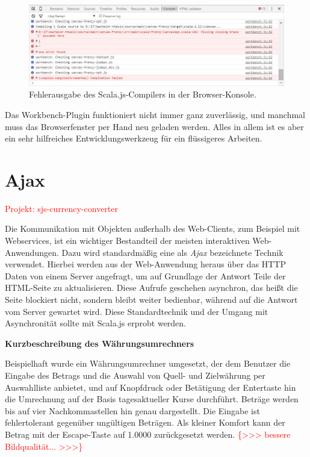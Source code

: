 \documentclass[a4paper, 12pt, hidelinks, listof=totoc, listoftables=totoc, bibliography=totoc]{scrreprt}
\newcommand{\TODO}[1]{\textcolor{red}{#1}\newline}
\newcommand{\TODOi}[1]{\textcolor{red}{\{#1\}}}
\newcommand{\MyMiniSec}[1]{\rmfamily\fontsize{12}{15}\selectfont
	\vspace{7pt}\textbf{#1} %
}
\begin{document}
\begin{figure}[!h]
    \centering
    \includegraphics[width=1.0\textwidth]{workbench-in-action2}
    \caption{Fehlerausgabe des Scala.js-Compilers in der Browser-Konsole.}
    \label{fig:workbench-in-action2}
\end{figure}

Das Workbench-Plugin funktioniert nicht immer ganz zuverlässig, und manchmal muss das Browserfenster per Hand neu geladen werden. Alles in allem ist es aber ein sehr hilfreiches Entwicklungswerkzeug für ein flüssigeres Arbeiten.



\section{Ajax}

\TODO{Projekt: sjs-currency-converter}

Die Kommunikation mit Objekten außerhalb des Web-Clients, zum Beispiel mit Webservices, ist ein wichtiger Bestandteil der meisten interaktiven Web-Anwendungen. Dazu wird standardmäßig eine als \emph{Ajax} bezeichnete Technik verwendet. Hierbei werden aus der Web-Anwendung heraus über das \ac{HTTP} Daten von einem Server angefragt, um auf Grundlage der Antwort Teile der \ac{HTML}-Seite zu aktualisieren. \cite[S.~491]{flanagan2011.JDG} Diese Aufrufe geschehen asynchron, das heißt die Seite blockiert nicht, sondern bleibt weiter bedienbar, während auf die Antwort vom Server gewartet wird. Diese Standardtechnik und der Umgang mit Asynchronität sollte mit Scala.js erprobt werden.


\MyMiniSec{Kurzbeschreibung des Währungsumrechners}

Beispielhaft wurde ein Währungsumrechner umgesetzt, der dem Benutzer die Eingabe des Betrags und die Auswahl von Quell- und Zielwährung per Auswahlliste anbietet, und auf Knopfdruck oder Betätigung der Entertaste hin die Umrechnung auf der Basis tagesaktueller Kurse durchführt. Beträge werden bis auf vier Nachkommastellen hin genau dargestellt. Die Eingabe ist fehlertolerant gegenüber ungültigen Beträgen. Als kleiner Komfort kann der Betrag mit der Escape-Taste auf 1.0000 zurückgesetzt werden. \TODOi{>>> bessere Bildqualität... >>>}
\end{document}

